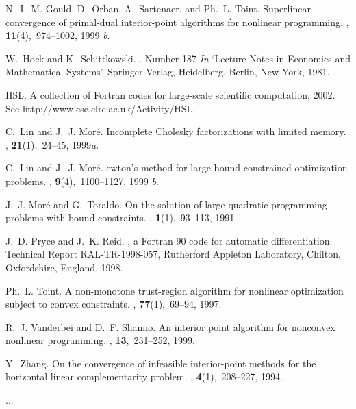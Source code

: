 \documentclass[acmtocl,acmnow]{acmtrans2m}
\begin{document}
\begin{thebibliography}{xx}
N.~I.~M. Gould, D.~Orban, A.~Sartenaer, and Ph.~L. Toint.
\newblock Superlinear convergence of primal-dual interior-point algorithms for
  nonlinear programming.
, {\bf 11}(4),~974--1002, 1999{\em
  b}.

W.~Hock and K.~Schittkowski.
.
\newblock Number 187 {\em In} `Lecture Notes in Economics and Mathematical
  Systems'. Springer Verlag, Heidelberg, Berlin, New York, 1981.

HSL.
\newblock A collection of {F}ortran codes for large-scale scientific
  computation, 2002.
\newblock See http://www.cse.clrc.ac.uk/Activity/HSL.

C.~Lin and J.~J. Mor\'{e}.
\newblock Incomplete {C}holesky factorizations with limited memory.
, {\bf 21}(1),~24--45,
  1999{\em a}.

C.~Lin and J.~J. Mor\'{e}.
ewton's method for large bound-constrained optimization problems.
, {\bf 9}(4),~1100--1127, 1999{\em
  b}.

J.~J. Mor\'{e} and G.~Toraldo.
\newblock On the solution of large quadratic programming problems with bound
  constraints.
, {\bf 1}(1),~93--113, 1991.

J.~D. Pryce and J.~K. Reid.
, a {F}ortran 90 code for automatic differentiation.
\newblock Technical Report RAL-TR-1998-057, Rutherford Appleton Laboratory,
  Chilton, Oxfordshire, England, 1998.

Ph.~L. Toint.
\newblock A non-monotone trust-region algorithm for nonlinear optimization
  subject to convex constraints.
, {\bf 77}(1),~69--94, 1997.

R.~J. Vanderbei and D.~F. Shanno.
\newblock An interior point algorithm for nonconvex nonlinear programming.
, {\bf
  13},~231--252, 1999.

Y.~Zhang.
\newblock On the convergence of infeasible interior-point methods for the
  horizontal linear complementarity problem.
, {\bf 4}(1),~208--227, 1994.

\end{thebibliography}

\begin{received}
...
\end{received}
\end{document}
